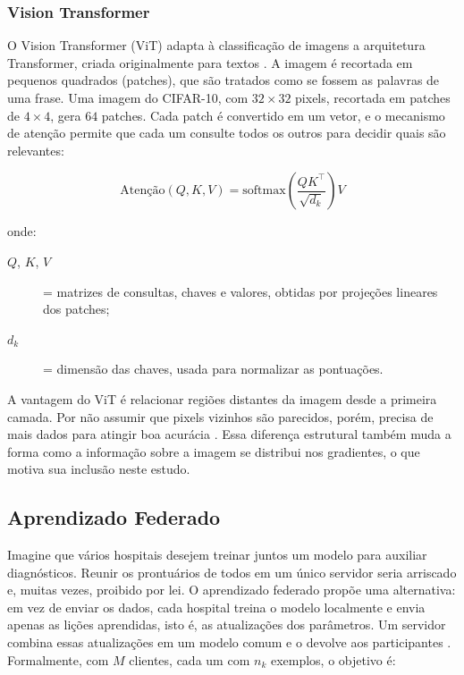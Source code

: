 \subsubsection{Vision Transformer}

O Vision Transformer (ViT) adapta à classificação de imagens a arquitetura Transformer, criada originalmente para textos \cite{Vaswani2017,Dosovitskiy2021}. A imagem é recortada em pequenos quadrados (patches), que são tratados como se fossem as palavras de uma frase. Uma imagem do CIFAR-10, com $32 \times 32$ pixels, recortada em patches de $4 \times 4$, gera $64$ patches. Cada patch é convertido em um vetor, e o mecanismo de atenção permite que cada um consulte todos os outros para decidir quais são relevantes:

\begin{equation} \label{eq:atencao}
\text{Atenção}(Q, K, V) = \mathrm{softmax}\!\left( \frac{Q K^{\top}}{\sqrt{d_k}} \right) V
\end{equation}

\noindent onde:
\begin{description}
  \item[$Q$, $K$, $V$] = matrizes de consultas, chaves e valores, obtidas por projeções lineares dos patches;
  \item[$d_k$] = dimensão das chaves, usada para normalizar as pontuações.
\end{description}

A vantagem do ViT é relacionar regiões distantes da imagem desde a primeira camada. Por não assumir que pixels vizinhos são parecidos, porém, precisa de mais dados para atingir boa acurácia \cite{Dosovitskiy2021}. Essa diferença estrutural também muda a forma como a informação sobre a imagem se distribui nos gradientes, o que motiva sua inclusão neste estudo.

\subsection{Aprendizado Federado} \label{sec:fl}

Imagine que vários hospitais desejem treinar juntos um modelo para auxiliar diagnósticos. Reunir os prontuários de todos em um único servidor seria arriscado e, muitas vezes, proibido por lei. O aprendizado federado propõe uma alternativa: em vez de enviar os dados, cada hospital treina o modelo localmente e envia apenas as lições aprendidas, isto é, as atualizações dos parâmetros. Um servidor combina essas atualizações em um modelo comum e o devolve aos participantes \cite{McMahan2017}. Formalmente, com $M$ clientes, cada um com $n_k$ exemplos, o objetivo é:

